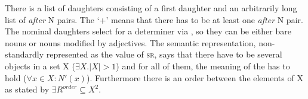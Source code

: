 \documentclass[output=paper
	        ,collection
	        ,collectionchapter
 	        ,biblatex
                ,babelshorthands
                ,newtxmath
                ,draftmode
                ,colorlinks, citecolor=brown
]{langscibook}
\begin{document}
\z
There is a list of daughters consisting of a first daughter and an arbitrarily long list of
\emph{after} N pairs. The `+'\is{+} means that there has to be at least one \emph{after} N pair. The
nominal daughters select for a determiner via \spr, so they can be either bare nouns or nouns
modified by adjectives. The semantic representation, non-standardly represented as the value of
\textsc{sr}, says that there have to be several objects in a set X ($\exists X.|X| >1$) and for all of them, the meaning
of the \nbar has to hold ($\forall x \in X:N'(x)$). Furthermore there is an order between the elements of X as stated by $\exists R^{order} \subseteq X^{2}$.


\end{document}
